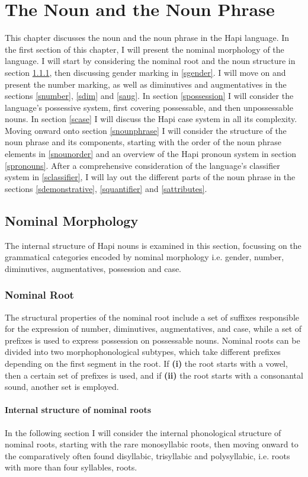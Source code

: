 \documentclass[a4paper, 12pt, oneside]{memoir}
\begin{document}
\chapter{The Noun and the Noun Phrase}
This chapter discusses the noun and the noun phrase in the Hapi language. In the first section of this chapter, I will present the nominal morphology of the language. I will start by considering the nominal root and the noun structure in section \ref{snomroot}, then discussing gender marking in \ref{sgender}. I will move on and present the number marking, as well as diminutives and augmentatives in the sections \ref{snumber}, \ref{sdim} and \ref{saug}. In section \ref{spossession} I will consider the language's possessive system, first covering possessable, and then unpossessable nouns. In section \ref{scase} I will discuss the Hapi case system in all its complexity.
Moving onward onto section \ref{snounphrase} I will consider the structure of the noun phrase and its components, starting with the order of the noun phrase elements in \ref{snounorder} and an overview of the Hapi pronoun system in section \ref{spronouns}. After a comprehensive consideration of the language's classifier system in \ref{sclassifier}, I will lay out the different parts of the noun phrase in the sections \ref{sdemonstrative}, \ref{squantifier} and \ref{sattributes}.

\section{Nominal Morphology}
The internal structure of Hapi nouns is examined in this section, focussing on the grammatical categories encoded by nominal morphology i.e. gender, number, diminutives, augmentatives, possession and case.
\subsection{Nominal Root}\label{snomroot}
The structural properties of the nominal root include a set of suffixes responsible for the expression of number, diminutives, augmentatives, and case, while a set of prefixes is used to express possession on possessable nouns. Nominal roots can be divided into two morphophonological subtypes, which take different prefixes depending on the first segment in the root. If \textbf{(i)} the root starts with a vowel, then a certain set of prefixes is used, and if \textbf{(ii)} the root starts with a consonantal sound, another set is employed. 
\subsubsection{Internal structure of nominal roots}
In the following section I will consider the internal phonological structure of nominal roots, starting with the rare monosyllabic roots, then moving onward to the comparatively often found disyllabic, trisyllabic and polysyllabic, i.e. roots with more than four syllables, roots.
\end{document}
